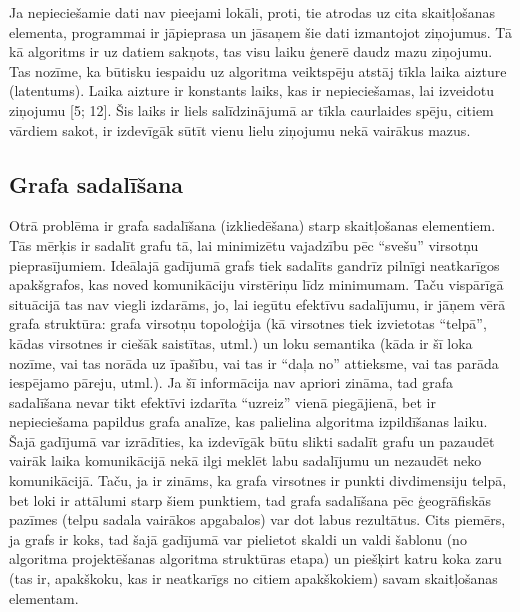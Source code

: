 

Ja nepieciešamie dati nav pieejami lokāli, proti, tie atrodas uz cita skaitļošanas
elementa, programmai ir jāpieprasa un jāsaņem šie dati izmantojot ziņojumus. Tā kā algoritms
ir uz datiem sakņots, tas visu laiku ģenerē daudz mazu ziņojumu. Tas nozīme, ka būtisku iespaidu
uz algoritma veiktspēju atstāj tīkla laika aizture (latentums). Laika aizture ir konstants laiks,
kas ir nepieciešamas, lai izveidotu ziņojumu [5; 12]. Šis laiks ir liels salīdzinājumā ar
tīkla caurlaides spēju, citiem vārdiem sakot, ir izdevīgāk sūtīt vienu lielu ziņojumu nekā
vairākus mazus.

\subsection{Grafa sadalīšana}
Otrā problēma ir grafa sadalīšana (izkliedēšana) starp skaitļošanas elementiem. Tās mērķis
ir sadalīt grafu tā, lai minimizētu vajadzību pēc “svešu” virsotņu pieprasījumiem. Ideālajā
gadījumā grafs tiek sadalīts gandrīz pilnīgi neatkarīgos apakšgrafos, kas noved komunikāciju
virstēriņu līdz minimumam. Taču vispārīgā situācijā tas nav viegli izdarāms, jo, lai iegūtu
efektīvu sadalījumu, ir jāņem vērā grafa struktūra: grafa virsotņu topoloģija (kā virsotnes
tiek izvietotas “telpā”, kādas virsotnes ir ciešāk saistītas, utml.) un loku semantika (kāda
ir šī loka nozīme, vai tas norāda uz īpašību, vai tas ir “daļa no” attieksme, vai tas parāda
iespējamo pāreju, utml.). Ja šī informācija nav apriori zināma, tad grafa sadalīšana nevar tikt
efektīvi izdarīta “uzreiz” vienā piegājienā, bet ir nepieciešama papildus grafa analīze, kas
palielina algoritma izpildīšanas laiku. Šajā gadījumā var izrādīties, ka izdevīgāk būtu slikti
sadalīt grafu un pazaudēt vairāk laika komunikācijā nekā ilgi meklēt labu sadalījumu un
nezaudēt neko komunikācijā. Taču, ja ir zināms, ka grafa virsotnes ir punkti divdimensiju
telpā, bet loki ir attālumi starp šiem punktiem, tad grafa sadalīšana pēc ģeogrāfiskās pazīmes
(telpu sadala vairākos apgabalos) var dot labus rezultātus. Cits piemērs, ja grafs ir koks,
tad šajā gadījumā var pielietot skaldi un valdi šablonu (no algoritma projektēšanas algoritma
struktūras etapa) un piešķirt katru koka zaru (tas ir, apakškoku, kas ir neatkarīgs no citiem
apakškokiem) savam skaitļošanas elementam.

